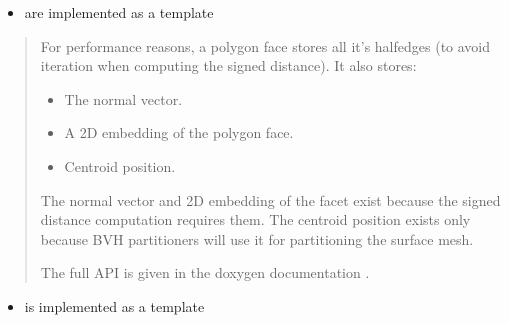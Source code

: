 \documentclass[letterpaper,10pt,english]{sphinxmanual}
\begin{document}
\begin{itemize}
\item {} 
\sphinxAtStartPar
{} are implemented as a template 

\end{itemize}
\begin{quote}

\begin{sphinxVerbatim}[commandchars=\\\{\}]
\end{sphinxVerbatim}

\sphinxAtStartPar
For performance reasons, a polygon face stores all it’s half\sphinxhyphen{}edges (to avoid iteration when computing the signed distance).
It also stores:
\begin{itemize}
\item {} 
\sphinxAtStartPar
The normal vector.

\item {} 
\sphinxAtStartPar
A 2D embedding of the polygon face.

\item {} 
\sphinxAtStartPar
Centroid position.

\end{itemize}

\sphinxAtStartPar
The normal vector and 2D embedding of the facet exist because the signed distance computation requires them.
The centroid position exists only because BVH partitioners will use it for partitioning the surface mesh.

\sphinxAtStartPar
The full API is given in the doxygen documentation .
\end{quote}
\begin{itemize}
\item {} 
\sphinxAtStartPar
{} is implemented as a template 

\end{itemize}
\end{document}
